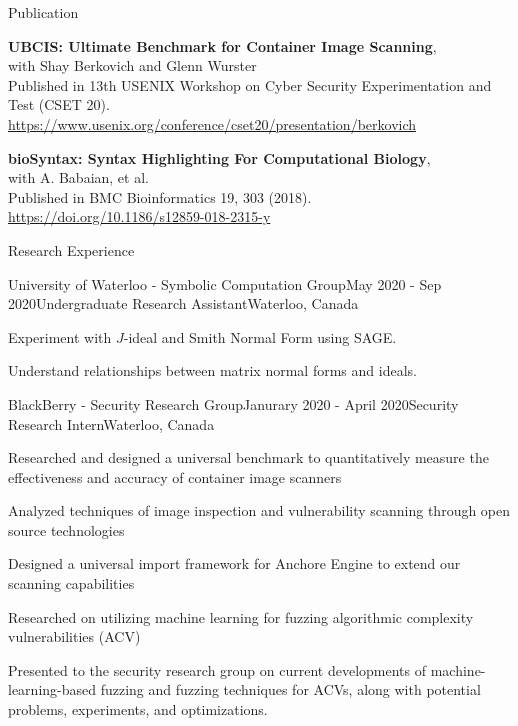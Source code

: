 \documentclass{cv}
\begin{document}
\begin{rSection}{Publication}
\begin{rSubsectionPure}
	\item \textbf{{UBCIS}: Ultimate Benchmark for Container Image Scanning}, \\
	with Shay Berkovich and Glenn Wurster \\
	Published in 13th {USENIX} Workshop on Cyber Security Experimentation and Test ({CSET} 20). \\
	\href{https://www.usenix.org/conference/cset20/presentation/berkovich}{https://www.usenix.org/conference/cset20/presentation/berkovich}
\end{rSubsectionPure}

\begin{rSubsectionPure}
	\item \textbf{bioSyntax: Syntax Highlighting For Computational Biology}, \\
	with A. Babaian, et al. \\
	Published in BMC Bioinformatics 19, 303 (2018). \\
	\href{https://doi.org/10.1186/s12859-018-2315-y}{https://doi.org/10.1186/s12859-018-2315-y}
\end{rSubsectionPure}
\end{rSection}

\begin{rSection}{Research Experience}
\begin{rSubsection}{University of Waterloo - Symbolic Computation Group}{May 2020 - Sep 2020}{Undergraduate Research Assistant}{Waterloo, Canada}
	\item Experiment with $J$-ideal and Smith Normal Form using SAGE.
  	\item Understand relationships between matrix normal forms and ideals.
\end{rSubsection}

\begin{rSubsection}{BlackBerry - Security Research Group}{Janurary 2020 - April 2020}{Security Research Intern}{Waterloo, Canada}
	\item Researched and designed a universal benchmark to quantitatively measure the effectiveness and accuracy of container image scanners
	\item Analyzed techniques of image inspection and vulnerability scanning through open source technologies
	\item Designed a universal import framework for Anchore Engine to extend our scanning capabilities
	\item Researched on utilizing machine learning for fuzzing algorithmic complexity vulnerabilities (ACV)
	\item Presented to the security research group on current developments of machine-learning-based fuzzing and fuzzing techniques for ACVs, along with potential problems, experiments, and optimizations.
\end{rSubsection}
\end{rSection}
\end{document}
